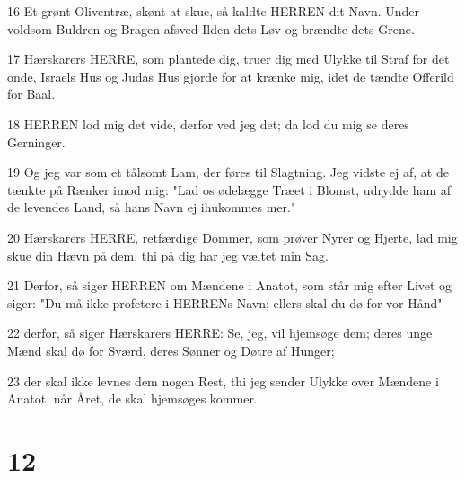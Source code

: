 \par 16 Et grønt Oliventræ, skønt at skue, så kaldte HERREN dit Navn. Under voldsom Buldren og Bragen afsved Ilden dets Løv og brændte dets Grene.
\par 17 Hærskarers HERRE, som plantede dig, truer dig med Ulykke til Straf for det onde, Israels Hus og Judas Hus gjorde for at krænke mig, idet de tændte Offerild for Baal.
\par 18 HERREN lod mig det vide, derfor ved jeg det; da lod du mig se deres Gerninger.
\par 19 Og jeg var som et tålsomt Lam, der føres til Slagtning. Jeg vidste ej af, at de tænkte på Rænker imod mig: "Lad os ødelægge Træet i Blomst, udrydde ham af de levendes Land, så hans Navn ej ihukommes mer."
\par 20 Hærskarers HERRE, retfærdige Dommer, som prøver Nyrer og Hjerte, lad mig skue din Hævn på dem, thi på dig har jeg væltet min Sag.
\par 21 Derfor, så siger HERREN om Mændene i Anatot, som står mig efter Livet og siger: "Du må ikke profetere i HERRENs Navn; ellers skal du dø for vor Hånd"
\par 22 derfor, så siger Hærskarers HERRE: Se, jeg, vil hjemsøge dem; deres unge Mænd skal dø for Sværd, deres Sønner og Døtre af Hunger;
\par 23 der skal ikke levnes dem nogen Rest, thi jeg sender Ulykke over Mændene i Anatot, når Året, de skal hjemsøges kommer.

\chapter{12}

